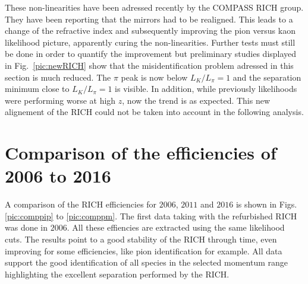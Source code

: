 These non-linearities have been adressed recently by the COMPASS RICH group. They have been reporting that the mirrors had to be realigned. This leads to a change of the refractive index and subsequently improving the pion versus kaon likelihood picture, apparently curing the non-linearities. Further tests must still be done in order to quantify the improvement but preliminary studies \cite{MarcinNew} displayed in Fig.~\ref{pic:newRICH} show that the misidentification problem adressed in this section is much reduced. The $\pi$ peak is now below $L_{K}/L_{\pi} = 1$ and the separation minimum close to $L_{K}/L_{\pi} = 1$ is visible. In addition, while previously likelihoods were performing worse at high $z$, now the trend is as expected. This new alignement of the RICH could not be taken into account in the following analysis.

\section{Comparison of the efficiencies of 2006 to 2016}

A comparison of the RICH efficiencies for $2006$, $2011$ and $2016$ is shown in Figs. \ref{pic:comppip} to \ref{pic:comppm}. The first data taking with the refurbished RICH was done in $2006$. All these effiencies are extracted using the same likelihood cuts. The results point to a good stability of the RICH through time, even improving for some efficiencies, like pion identification for example. All data support the good identification of all species in the selected momentum range highlighting the excellent separation performed by the RICH.

